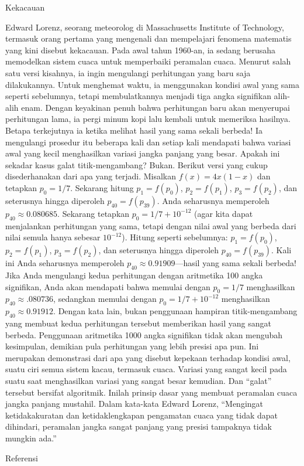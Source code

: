 \noindent\begin{digression}{Kekacauan} 

\noindent Edward Lorenz, seorang meteorolog
di Massachusetts Institute of Technology, termasuk orang pertama yang
mengenali dan mempelajari fenomena matematis yang kini disebut kekacauan.
Pada awal tahun 1960-an, ia sedang berusaha memodelkan sistem cuaca
untuk memperbaiki peramalan cuaca. Menurut salah satu versi kisahnya,
ia ingin mengulangi perhitungan yang baru saja dilakukannya. Untuk
menghemat waktu, ia menggunakan kondisi awal yang sama seperti sebelumnya,
tetapi membulatkannya menjadi tiga angka signifikan alih-alih enam.
Dengan keyakinan penuh bahwa perhitungan baru akan menyerupai perhitungan
lama, ia pergi minum kopi lalu kembali untuk memeriksa hasilnya. Betapa
terkejutnya ia ketika melihat hasil yang sama sekali berbeda! Ia mengulangi
prosedur itu beberapa kali dan setiap kali mendapati bahwa variasi
awal yang kecil menghasilkan variasi jangka panjang yang besar. Apakah
ini sekadar kasus galat titik-mengambang? Bukan. Berikut versi yang
cukup disederhanakan dari apa yang terjadi. Misalkan $f(x)=4x(1-x)$
dan tetapkan $p_{0}=1/7$. Sekarang hitung $p_{1}=f(p_{0})$, $p_{2}=f(p_{1})$,
$p_{3}=f(p_{2})$, dan seterusnya hingga diperoleh $p_{40}=f(p_{39})$.
Anda seharusnya memperoleh $p_{40}\approx0.080685$. Sekarang tetapkan
$p_{0}=1/7+10^{-12}$ (agar kita dapat menjalankan perhitungan yang
sama, tetapi dengan nilai awal yang berbeda dari nilai semula hanya
sebesar $10^{-12}$). Hitung seperti sebelumnya: $p_{1}=f(p_{0})$,
$p_{2}=f(p_{1})$, $p_{3}=f(p_{2})$, dan seterusnya hingga diperoleh
$p_{40}=f(p_{39})$. Kali ini Anda seharusnya memperoleh $p_{40}\approx0.91909$---hasil
yang sama sekali berbeda! Jika Anda mengulangi kedua perhitungan dengan
aritmetika 100 angka signifikan, Anda akan mendapati bahwa memulai
dengan $p_{0}=1/7$ menghasilkan $p_{40}\approx.080736$, sedangkan
memulai dengan $p_{0}=1/7+10^{-12}$ menghasilkan $p_{40}\approx0.91912$.
Dengan kata lain, bukan penggunaan hampiran titik-mengambang yang
membuat kedua perhitungan tersebut memberikan hasil yang sangat berbeda.
Penggunaan aritmetika 1000 angka signifikan tidak akan mengubah kesimpulan,
demikian pula perhitungan yang lebih presisi apa pun. Ini merupakan
demonstrasi dari apa yang disebut kepekaan terhadap kondisi awal,
suatu ciri semua sistem kacau, termasuk cuaca. Variasi yang sangat
kecil pada suatu saat menghasilkan variasi yang sangat besar kemudian.
Dan ``galat'' tersebut bersifat algoritmik. Inilah prinsip dasar
yang membuat peramalan cuaca jangka panjang mustahil. Dalam kata-kata
Edward Lorenz, ``Mengingat ketidakakuratan dan ketidaklengkapan pengamatan
cuaca yang tidak dapat dihindari, peramalan jangka sangat panjang
yang presisi tampaknya tidak mungkin ada.''
\begin{description}
\item [{Referensi}] \cite{lorenz,gulick,mirror}
\end{description}
\noindent\end{digression} 

